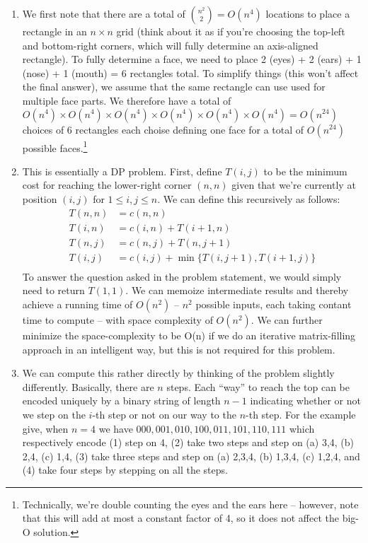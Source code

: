 \documentclass[12pt]{article}
\begin{document}
\begin{enumerate}[label=(\alph*)]
  \item We first note that there are a total of ${n^2 \choose 2} = O(n^4)$ locations to place a rectangle in an $n \times n$ grid (think about it as if you're choosing the top-left and bottom-right corners, which will fully determine an axis-aligned rectangle). To fully determine a face, we need to place 2 (eyes) + 2 (ears) + 1 (nose) + 1 (mouth) = 6 rectangles total. To simplify things (this won't affect the final answer), we assume that the same rectangle can use used for multiple face parts. We therefore have a total of $O(n^4)\times O(n^4) \times O(n^4) \times O(n^4) \times O(n^4) \times O(n^4)  = O(n^24)$ choices of 6 rectangles each choise defining one face for a total of $O(n^24)$ possible faces.\footnote{Technically, we're double counting the eyes and the ears here -- however, note that this will add at most a constant factor of 4, so it does not affect the big-O solution.}

  \item This is essentially a DP problem. First, define $T(i,j)$ to be the minimum cost for reaching the lower-right corner $(n,n)$ given that we're currently at position $(i,j)$ for $1 \leq i, j\leq n$. We can define this recursively as follows:
  \begin{align*}
    T(n,n) &= c(n,n) \\
    T(i,n) &= c(i,n) + T(i + 1, n) \\
    T(n,j) &= c(n,j) + T(n, j + 1) \\ 
    T(i,j) &= c(i,j) + \min\{ T(i, j+1), T(i+1, j) \} \\
  \end{align*}
  To answer the question asked in the problem statement, we would simply need to return $T(1,1)$. We can memoize intermediate results and thereby achieve a running time of $O(n^2)$ -- $n^2$ possible inputs, each taking contant time to compute -- with space complexity of $O(n^2)$. We can further minimize the space-complexity to be O(n) if we do an iterative matrix-filling approach in an intelligent way, but this is not required for this problem.

  \item We can compute this rather directly by thinking of the problem slightly differently. Basically, there are $n$ steps. Each ``way'' to reach the top can be encoded uniquely by a binary string of length $n-1$ indicating whether or not we step on the $i$-th step or not on our way to the $n$-th step. For the example give, when $n = 4$ we have $000, 001, 010, 100, 011, 101, 110, 111$ which respectively encode (1) step on 4, (2) take two steps and step on (a) 3,4, (b) 2,4, (c) 1,4, (3) take three steps and step on (a) 2,3,4, (b) 1,3,4, (c) 1,2,4, and (4) take four steps by stepping on all the steps.


\end{enumerate}
\end{document}
